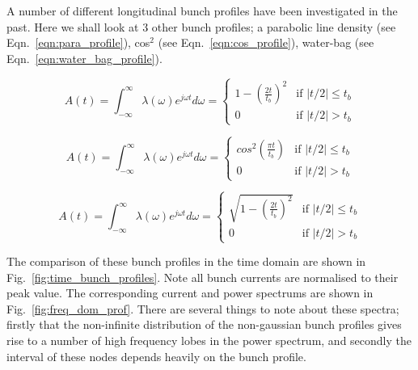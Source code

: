 A number of different longitudinal bunch profiles have been investigated in the past. Here we shall look at 3 other bunch profiles; a parabolic line density (see Eqn.~\ref{eqn:para_profile}), cos$^{2}$ (see Eqn.~\ref{eqn:cos_profile}), water-bag (see Eqn.~\ref{eqn:water_bag_profile}).

\begin{equation}
A\left( t \right) = \int^{\infty}_{-\infty} \lambda \left( \omega \right) e^{j\omega t} d\omega = 
\begin{cases}1-\left( \frac{2t} {t_{b}} \right)^{2} &\textrm{if $| t/2 | \leq t_{b}$}\\
0								&\textrm{if $| t/2 | > t_{b}$}
\end{cases}
\label{eqn:para_profile}
\end{equation}

\begin{equation}
A\left( t \right) = \int^{\infty}_{-\infty} \lambda \left( \omega \right) e^{j\omega t} d\omega = 
\begin{cases}
cos^{2}\left( \frac{\pi t} {t_{b}} \right) &\textrm{if $| t/2 | \leq t_{b}$}\\
0								&\textrm{if $| t/2 | > t_{b}$}
\end{cases}
\label{eqn:cos_profile}
\end{equation}

\begin{equation}
A\left( t \right) = \int^{\infty}_{-\infty} \lambda \left( \omega \right) e^{j\omega t} d\omega = 
\begin{cases}
\sqrt{1-\left( \frac{2t}{t_{b}}\right)^{2}} &\textrm{if $| t/2 | \leq t_{b}$}\\
0								&\textrm{if $| t/2 | > t_{b}$}
\end{cases}
\label{eqn:water_bag_profile}
\end{equation}

The comparison of these bunch profiles in the time domain are shown in Fig.~\ref{fig:time_bunch_profiles}. Note all bunch currents are normalised to their peak value. The corresponding current and power spectrums are shown in Fig.~\ref{fig:freq_dom_prof}. There are several things to note about these spectra; firstly that the non-infinite distribution of the non-gaussian bunch profiles gives rise to a number of high frequency lobes in the power spectrum, and secondly the interval of these nodes depends heavily on the bunch profile.

